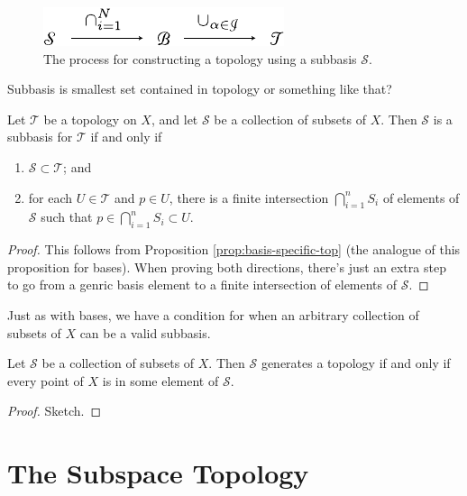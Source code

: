 \documentclass[10pt]{report}
\begin{document}
\begin{figure}[H]
	\centering
	\includegraphics[scale=1]{fig/subbasis-to-topology.pdf}
	\caption{The process for constructing a topology using a subbasis $\mathcal{S}$.}
\end{figure}

{\color{red}Subbasis is smallest set contained in topology or something like that?}

\begin{prop}
Let $\mathcal{T}$ be a topology on $X$, and let $\mathcal{S}$ be a collection of subsets of $X$. Then $\mathcal{S}$ is a subbasis for $\mathcal{T}$ if and only if
\begin{enumerate}
	\item $\mathcal{S} \subset \mathcal{T}$; and
	\item for each $U \in \mathcal{T}$ and $p \in U$, there is a finite intersection $\bigcap_{i=1}^n S_i$ of elements of $\mathcal{S}$ such that $p \in \bigcap_{i=1}^n S_i \subset U$.
\end{enumerate}
\end{prop}
\begin{proof}
	This follows from Proposition \ref{prop:basis-specific-top} (the analogue of this proposition for bases). When proving both directions, there's just an extra step to go from a genric basis element to a finite intersection of elements of $\mathcal{S}$.
\end{proof}

Just as with bases, we have a condition for when an arbitrary collection of subsets of $X$ can be a valid subbasis.

\begin{prop}
Let $\mathcal{S}$ be a collection of subsets of $X$. Then $\mathcal{S}$ generates a topology if and only if every point of $X$ is in some element of $\mathcal{S}$.
\end{prop}
\begin{proof}
{\color{red}Sketch.}
\end{proof}


\section{The Subspace Topology}
\end{document}
